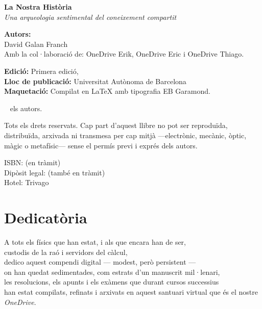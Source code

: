 \thispagestyle{empty}
\newpage

\noindent\textbf{\LARGE La Nostra Història} \\
\vspace{0.5cm}
\noindent\textit{Una arqueologia sentimental del coneixement compartit} \\

\vspace{1cm}

\noindent\textbf{Autors:} \\[0.3em]
David Galan Franch \\[0.3em]
Amb la col·laboració de: OneDrive Erik, OneDrive Eric i OneDrive Thiago.

\vspace{0.5cm}

\noindent\textbf{Edició:} Primera edició, \the\year \\
\textbf{Lloc de publicació:} Universitat Autònoma de Barcelona \\
\textbf{Maquetació:} Compilat en \LaTeX{} amb tipografia EB Garamond.

\vspace{0.5cm}

\noindent\textcopyright\
 \the\year{} els autors.

\noindent Tots els drets reservats. Cap part d’aquest llibre no pot ser reproduïda, distribuïda, arxivada ni transmesa per cap mitjà —electrònic, mecànic, òptic, màgic o metafísic— sense el permís previ i exprés dels autors.

\vspace{0.5cm}

\noindent ISBN: (en tràmit) \\
Dipòsit legal: (també en tràmit) \\
Hotel: Trivago

\cleardoublepage


\chapter*{Dedicatòria}
\vspace{2cm}

\noindent
A tots els físics que han estat, i als que encara han de ser,\\
custodis de la raó i servidors del càlcul,\\
dedico aquest compendi digital — modest, però persistent —\\
on han quedat sedimentades, com estrats d’un manuscrit mil·lenari,\\
les resolucions, els apunts i els exàmens que durant cursos successius\\
han estat compilats, refinats i arxivats en aquest santuari virtual que és el nostre \textit{OneDrive}.\\

